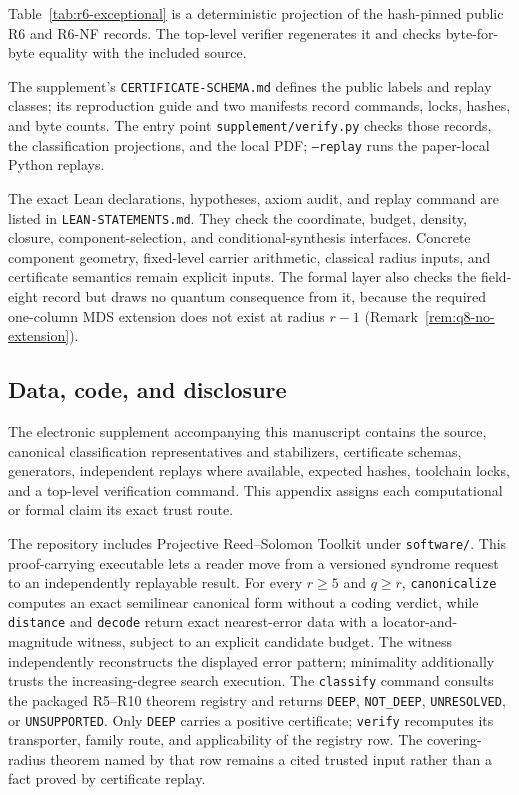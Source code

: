 Table~\ref{tab:r6-exceptional} is a deterministic projection of the
hash-pinned public R6 and R6-NF records.  The top-level verifier
regenerates it and checks byte-for-byte equality with the included
source.

The supplement's \texttt{CERTIFICATE-SCHEMA.md} defines the public labels and
replay classes; its reproduction guide and two manifests record commands,
locks, hashes, and byte counts. The entry point \texttt{supplement/verify.py}
checks those records, the classification projections, and the local PDF;
\texttt{--replay} runs the paper-local Python replays.

The exact Lean declarations, hypotheses, axiom audit, and replay command are
listed in \texttt{LEAN-STATEMENTS.md}. They check the coordinate,
budget, density, closure, component-selection, and conditional-synthesis
interfaces. Concrete component geometry, fixed-level carrier arithmetic,
classical radius inputs, and certificate semantics remain explicit inputs.
The formal layer also checks the field-eight record but draws no quantum
consequence from it, because the required one-column MDS extension does not
exist at radius \(r-1\) (Remark~\ref{rem:q8-no-extension}).

\subsection{Data, code, and disclosure}\label{sec:provenance}

The electronic supplement accompanying this manuscript contains the
source, canonical classification representatives and stabilizers,
certificate schemas, generators, independent replays where available,
expected hashes, toolchain locks, and a top-level verification command.
This appendix assigns each computational or formal claim its exact trust
route.

The repository includes Projective Reed--Solomon Toolkit under
\texttt{software/}.  This proof-carrying executable lets a reader move from a
versioned syndrome request to an independently replayable result.  For every
$r\geq5$ and $q\geq r$, \texttt{canonicalize} computes an exact semilinear
canonical form without a coding verdict, while \texttt{distance} and
\texttt{decode} return exact nearest-error data with a locator-and-magnitude
witness, subject to an explicit candidate budget.  The witness independently
reconstructs the displayed error pattern; minimality additionally trusts the
increasing-degree search execution.  The
\texttt{classify} command consults the packaged R5--R10 theorem registry and
returns \texttt{DEEP}, \texttt{NOT\_DEEP}, \texttt{UNRESOLVED}, or
\texttt{UNSUPPORTED}.  Only \texttt{DEEP} carries a positive certificate;
\texttt{verify} recomputes its transporter, family route, and applicability of
the registry row.  The covering-radius theorem named by that row remains a
cited trusted input rather than a fact proved by certificate replay.

